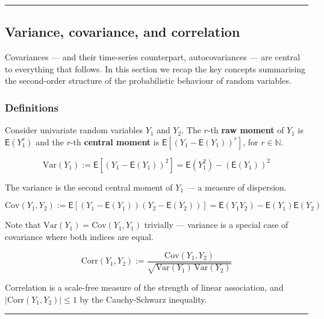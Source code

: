 \documentclass[
  letterpaper,
  DIV=11,
  numbers=noendperiod]{scrartcl}
\begin{document}
\begin{center}\rule{0.5\linewidth}{0.5pt}\end{center}

\subsection{Variance, covariance, and
correlation}\label{variance-covariance-and-correlation}

Covariances --- and their time-series counterpart, autocovariances ---
are central to everything that follows. In this section we recap the key
concepts summarising the second-order structure of the probabilistic
behaviour of random variables.

\subsubsection{Definitions}\label{definitions}

Consider univariate random variables \(Y_1\) and \(Y_2\). The \(r\)-th
\textbf{raw moment} of \(Y_1\) is \(\mathsf{E}(Y_1^r)\) and the \(r\)-th
\textbf{central moment} is
\(\mathsf{E}\!\left[(Y_1 - \mathsf{E}(Y_1))^r\right]\), for
\(r \in \mathbb{N}\).

\[\text{Var}(Y_1) := \mathsf{E}\!\left[(Y_1 - \mathsf{E}(Y_1))^2\right] = \mathsf{E}(Y_1^2) - (\mathsf{E}(Y_1))^2\]

The variance is the second central moment of \(Y_1\) --- a measure of
dispersion.

\[\text{Cov}(Y_1, Y_2) := \mathsf{E}\!\left[(Y_1 - \mathsf{E}(Y_1))(Y_2 - \mathsf{E}(Y_2))\right] = \mathsf{E}(Y_1 Y_2) - \mathsf{E}(Y_1)\mathsf{E}(Y_2)\]

Note that \(\text{Var}(Y_1) = \text{Cov}(Y_1, Y_1)\) trivially ---
variance is a special case of covariance where both indices are equal.

\[\text{Corr}(Y_1, Y_2) := \frac{\text{Cov}(Y_1, Y_2)}{\sqrt{\text{Var}(Y_1)\,\text{Var}(Y_2)}}\]

Correlation is a scale-free measure of the strength of linear
association, and \(|\text{Corr}(Y_1, Y_2)| \leq 1\) by the
Cauchy-Schwarz inequality.

\begin{center}\rule{0.5\linewidth}{0.5pt}\end{center}
\end{document}

